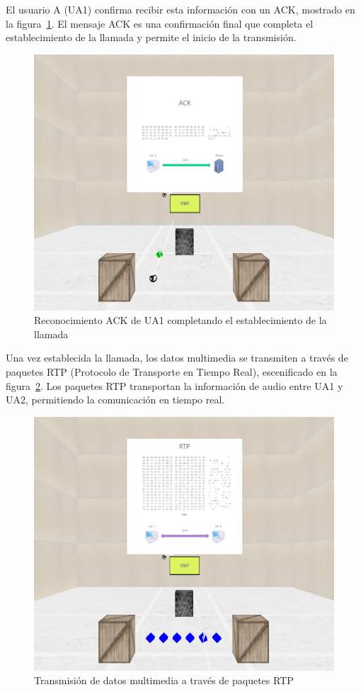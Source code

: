 \documentclass[a4paper, 12pt]{book}
\begin{document}
El usuario A (UA1) confirma recibir esta información con un ACK, mostrado en la figura~\ref{fig:10-ACK}. 
El mensaje ACK es una confirmación final que completa el establecimiento de la llamada y permite el inicio de la transmisión.

\bigskip

\begin{figure}[H]
  \centering
  \includegraphics[width=12cm, keepaspectratio]{img/resultados/13-ACK.PNG}
  \caption{Reconocimiento ACK de UA1 completando el establecimiento de la llamada}
  \label{fig:10-ACK}
\end{figure}
\clearpage

Una vez establecida la llamada, los datos multimedia se transmiten a través de 
paquetes RTP (Protocolo de Transporte en Tiempo Real), escenificado en la figura~\ref{fig:11-RTP}. 
Los paquetes RTP transportan la información de audio entre UA1 y UA2, permitiendo la comunicación en tiempo real.

\bigskip

\begin{figure}[H]
  \centering
  \includegraphics[width=12cm, keepaspectratio]{img/resultados/15-RTP.PNG}
  \caption{Transmisión de datos multimedia a través de paquetes RTP}
  \label{fig:11-RTP}
\end{figure}
\clearpage
\end{document}
